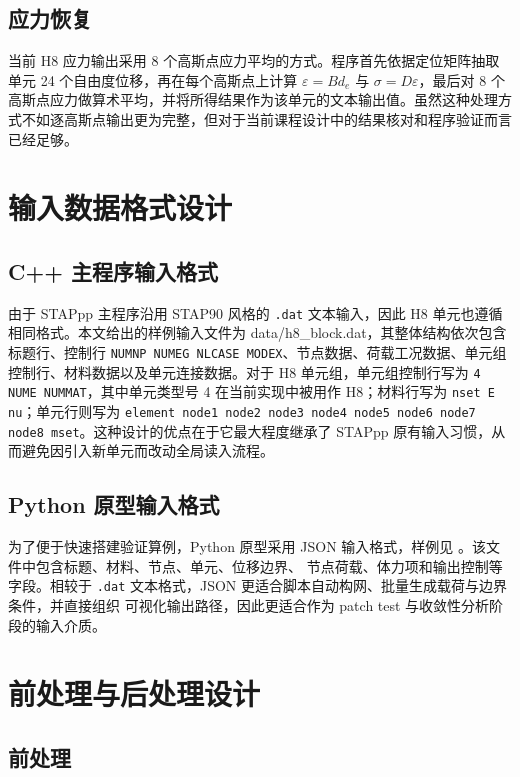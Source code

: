 \documentclass[12pt,a4paper]{article}
\begin{document}
\subsection{应力恢复}

当前 H8 应力输出采用 8 个高斯点应力平均的方式。程序首先依据定位矩阵抽取单元 24 个自由度位移，再在每个高斯点上计算 $\varepsilon = B d_e$ 与 $\sigma = D\varepsilon$，最后对 8 个高斯点应力做算术平均，并将所得结果作为该单元的文本输出值。虽然这种处理方式不如逐高斯点输出更为完整，但对于当前课程设计中的结果核对和程序验证而言已经足够。

\section{输入数据格式设计}

\subsection{C++ 主程序输入格式}

由于 STAPpp 主程序沿用 STAP90 风格的 \texttt{.dat} 文本输入，因此 H8 单元也遵循相同格式。本文给出的样例输入文件为 data/h8\_block.dat，其整体结构依次包含标题行、控制行 \texttt{NUMNP NUMEG NLCASE MODEX}、节点数据、荷载工况数据、单元组控制行、材料数据以及单元连接数据。对于 H8 单元组，单元组控制行写为 \texttt{4 NUME NUMMAT}，其中单元类型号 4 在当前实现中被用作 H8；材料行写为 \texttt{nset E nu}；单元行则写为 \texttt{element node1 node2 node3 node4 node5 node6 node7 node8 mset}。这种设计的优点在于它最大程度继承了 STAPpp 原有输入习惯，从而避免因引入新单元而改动全局读入流程。

\subsection{Python 原型输入格式}

为了便于快速搭建验证算例，Python 原型采用 JSON 输入格式，样例见
。该文件中包含标题、材料、节点、单元、位移边界、
节点荷载、体力项和输出控制等字段。相较于
\texttt{.dat} 文本格式，JSON 更适合脚本自动构网、批量生成载荷与边界条件，并直接组织
可视化输出路径，因此更适合作为 patch test 与收敛性分析阶段的输入介质。

\section{前处理与后处理设计}

\subsection{前处理}
\end{document}
